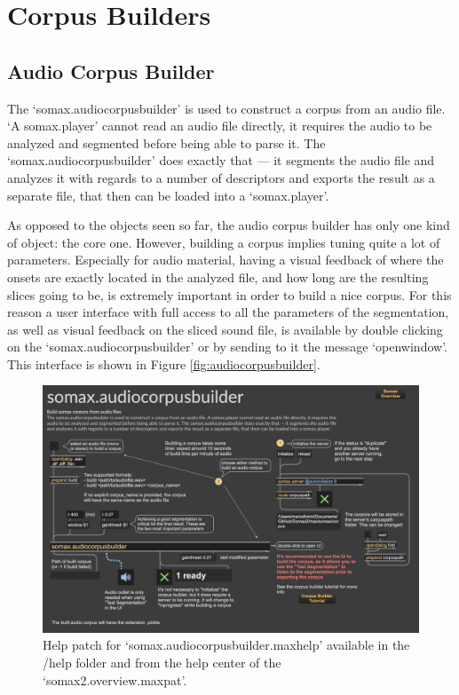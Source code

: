 \section {Corpus Builders}

\subsection{Audio Corpus Builder}

The `somax.audiocorpusbuilder' is used to construct a corpus from an audio file. `A somax.player' cannot read an audio file directly, it requires the audio to be analyzed and segmented before being able to parse it. The `somax.audiocorpusbuilder' does exactly that — it segments the audio file and analyzes it with regards to a number of descriptors and exports the result as a separate file, that then can be loaded into a `somax.player'.

As opposed to the objects seen so far, the audio corpus builder has only one kind of object: the core one. However, building a corpus implies tuning quite a lot of parameters. Especially for audio material, having a visual feedback of where the onsets are exactly located in the analyzed file, and how long are the resulting slices going to be, is extremely important in order to build a nice corpus. For this reason a user interface with full access to all the parameters of the segmentation, as well as visual feedback on the sliced sound file, is available by double clicking on the `somax.audiocorpusbuilder' or by sending to it the message `openwindow'. This interface is shown in Figure \ref{fig:audiocorpusbuilder}.

\begin{figure}[H]
    \centering        
 	\includegraphics[width=1\textwidth, keepaspectratio]{img/audiocorpusbuilder_help.png}
    \caption{Help patch for `somax.audiocorpusbuilder.maxhelp' available in the /help folder and from the help center of the `somax2.overview.maxpat'.}
    \label{fig:audiocorpusbuilder_help}
\end{figure}

